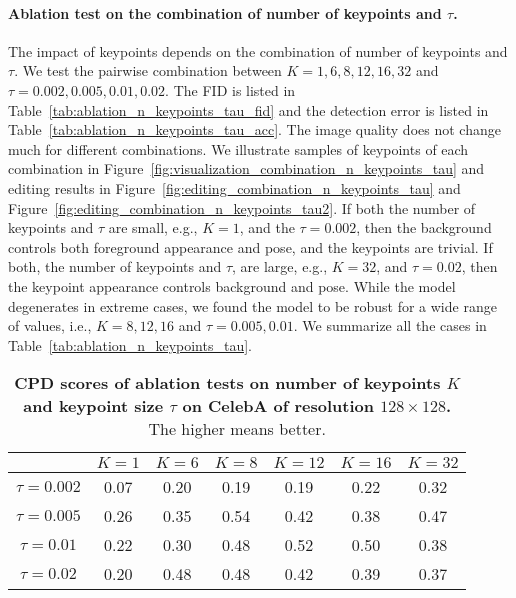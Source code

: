 \documentclass[10pt, conference, compsocconf]{IEEEtran}
\begin{document}
\paragraph{Ablation test on the combination of number of keypoints and $\tau$.} The impact of keypoints depends on the combination of number of keypoints and $\tau$. We test the pairwise combination between $K=1,6,8,12,16,32$ and $\tau=0.002, 0.005, 0.01, 0.02$. The FID is listed in Table~\ref{tab:ablation_n_keypoints_tau_fid} and the detection error is listed in Table~\ref{tab:ablation_n_keypoints_tau_acc}. The image quality does not change much for different combinations. We illustrate samples of keypoints of each combination in Figure~\ref{fig:visualization_combination_n_keypoints_tau} and editing results in Figure~\ref{fig:editing_combination_n_keypoints_tau} and Figure~\ref{fig:editing_combination_n_keypoints_tau2}. If both the number of keypoints and $\tau$ are small, e.g., $K=1$, and the $\tau=0.002$, then the background controls both foreground appearance and pose, and the keypoints are trivial. If both, the number of keypoints and $\tau$, are large, e.g., $K=32$, and $\tau=0.02$, then the keypoint appearance controls background and pose. While the model degenerates in extreme cases, we found the model to be robust for a wide range of values, i.e., $K=8, 12, 16$ and $\tau=0.005, 0.01$. We summarize all the cases in Table~\ref{tab:ablation_n_keypoints_tau}.

\begin{table*}[t]
\begin{center}
\begin{tabular}{|c|c|c|c|c|c|c|}
\hline
  & $K=1$ & $K=6$ & $K=8$ & $K=12$ & $K=16$ & $K=32$\\ 
\hline
$\tau=0.002$ & 0.07 & 0.20 & 0.19 & 0.19 & 0.22 & 0.32\\ 
$\tau=0.005$ & 0.26 & 0.35 & 0.54 & 0.42 & 0.38 & 0.47\\ 
$\tau=0.01$ & 0.22 & 0.30 & 0.48 & 0.52 & 0.50 & 0.38\\ 
$\tau=0.02$ & 0.20 & 0.48 & 0.48 & 0.42 & 0.39 &  0.37\\ 
\hline
\end{tabular}
\end{center}
\caption{\textbf{CPD scores of ablation tests on number of keypoints $K$ and keypoint size $\tau$ on CelebA of resolution $128\times 128$.} The higher means better. 
}
\label{tab:ablation_n_keypoints_tau_cpd}
\end{table*}
\end{document}
